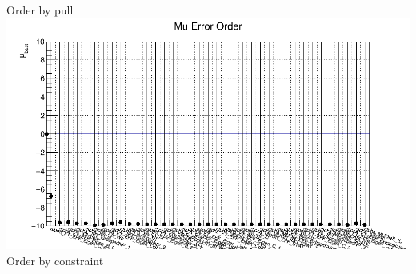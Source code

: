 \documentclass{beamer}
\begin{document}
\begin{frame}
\begin{columns}[t]
\tiny{ Order by pull }\\
\includegraphics[width=0.8\linewidth]{pics/mu_1lep_merge_order_constraint.png}\\ 
\tiny{ Order by constraint }\\
\end{columns}
\end{frame}
\end{document}
